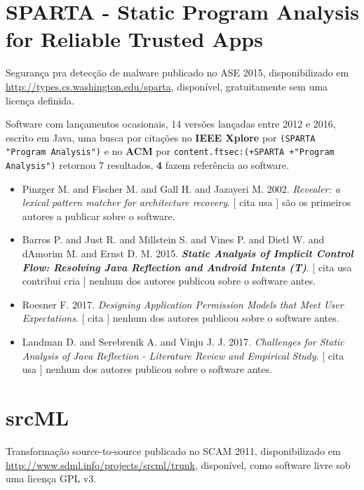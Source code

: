 \section{SPARTA - Static Program Analysis for Reliable Trusted Apps}

Segurança pra detecção de malware
publicado no ASE 2015,
disponibilizado em \url{http://types.cs.washington.edu/sparta},
disponível,
gratuitamente
sem uma licença definida.

Software com lançamentos ocasionais,
14 versões lançadas
entre 2012 e 2016,
escrito em Java,
uma busca por citações no {\bf IEEE Xplore} por
\texttt{(SPARTA "Program Analysis")}
e no {\bf ACM} por
\texttt{content.ftsec:(+SPARTA +"Program Analysis")}
retornou
7 resultados,
{\bf 4} fazem referência ao software.

\begin{itemize}
\item Pinzger M. and Fischer M. and Gall H. and Jazayeri M.
      2002.
        \textit{ Revealer: a lexical pattern matcher for architecture recovery}.
      [
          cita
          usa
      ]
são os primeiros autores a publicar sobre o software.
\item Barros P. and Just R. and Millstein S. and Vines P. and Dietl W. and dAmorim M. and Ernst D. M.
      2015.
        \textbf{\textit{ Static Analysis of Implicit Control Flow: Resolving Java Reflection and Android Intents (T)}}.
      [
          cita
          usa
          contribui
          cria
      ]
nenhum dos autores publicou sobre o software antes.
\item Roesner F.
      2017.
        \textit{ Designing Application Permission Models that Meet User Expectations}.
      [
          cita
      ]
nenhum dos autores publicou sobre o software antes.
\item Landman D. and Serebrenik A. and Vinju J. J.
      2017.
        \textit{ Challenges for Static Analysis of Java Reflection - Literature Review and Empirical Study}.
      [
          cita
          usa
      ]
nenhum dos autores publicou sobre o software antes.
\end{itemize}
\section{srcML}

Transformação source-to-source
publicado no SCAM 2011,
disponibilizado em \url{http://www.sdml.info/projects/srcml/trunk},
disponível,
como software livre
sob uma licença GPL v3.


